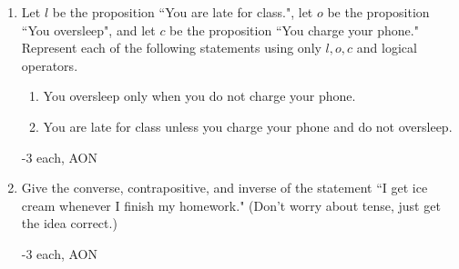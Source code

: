 \begin{enumerate}
    
    \item Let $l$ be the proposition ``You are late for class.", let $o$ be the proposition ``You oversleep", and let $c$ be the proposition ``You charge your phone." Represent each of the following statements using only $l, o, c$ and logical operators. 
    \begin{enumerate}
        \item You oversleep only when you do not charge your phone.
        \item You are late for class unless you charge your phone and do not oversleep.
    \end{enumerate}
    \begin{rubric}
        -3 each, AON
    \end{rubric}


    
    \item Give the converse, contrapositive, and inverse of the statement ``I get ice cream whenever I finish my homework." (Don't worry about tense, just get the idea correct.) 
    \begin{rubric}
        -3 each, AON
    \end{rubric}



\end{enumerate}
